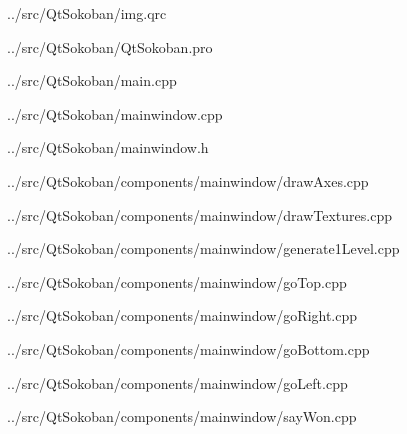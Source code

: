 
{../src/QtSokoban/img.qrc}


{../src/QtSokoban/QtSokoban.pro}

\newpage


{../src/QtSokoban/main.cpp}


{../src/QtSokoban/mainwindow.cpp}


{../src/QtSokoban/mainwindow.h}


{../src/QtSokoban/components/mainwindow/drawAxes.cpp}


{../src/QtSokoban/components/mainwindow/drawTextures.cpp}


{../src/QtSokoban/components/mainwindow/generate1Level.cpp}


{../src/QtSokoban/components/mainwindow/goTop.cpp}


{../src/QtSokoban/components/mainwindow/goRight.cpp}


{../src/QtSokoban/components/mainwindow/goBottom.cpp}

\newpage


{../src/QtSokoban/components/mainwindow/goLeft.cpp}

\newpage


{../src/QtSokoban/components/mainwindow/sayWon.cpp}
